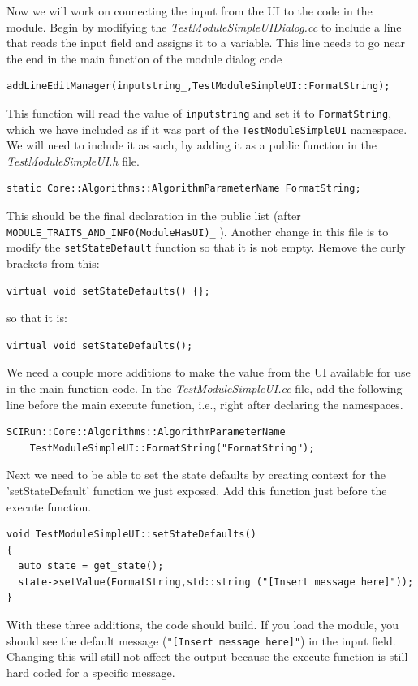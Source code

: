 \documentclass[fleqn,11pt,openany]{book}
\begin{document}
Now we will work on connecting the input from the UI to the code in the module.  
Begin by modifying the \emph{TestModuleSimpleUIDialog.cc} to include a line that reads the input field and assigns it to a variable. 
This line needs to go near the end in the main function of the module dialog code
\begin{verbatim}
addLineEditManager(inputstring_,TestModuleSimpleUI::FormatString);
\end{verbatim}
This function will read the value of \verb|inputstring| and set it to \verb|FormatString|, which we have included as if it was part of the \verb|TestModuleSimpleUI| namespace.  
We will need to include it as such, by adding it as a public function in the \emph{TestModuleSimpleUI.h} file.
\begin{verbatim}
static Core::Algorithms::AlgorithmParameterName FormatString;
\end{verbatim}
This should be the final declaration in the public list (after \verb|MODULE_TRAITS_AND_INFO(ModuleHasUI)_| ).
Another change in this file is to modify the \verb|setStateDefault| function so that it is not empty.  
Remove the curly brackets from this:
\begin{verbatim}
virtual void setStateDefaults() {};
\end{verbatim}
so that it is:
\begin{verbatim}
virtual void setStateDefaults();
\end{verbatim}
We need a couple more additions to make the value from the UI available for use in the main function code.  
In the \emph{TestModuleSimpleUI.cc} file, add the following line before the main execute function, i.e., right after declaring the namespaces.
\begin{verbatim}
SCIRun::Core::Algorithms::AlgorithmParameterName 
    TestModuleSimpleUI::FormatString("FormatString");
\end{verbatim}

Next we need to be able to set the state defaults by creating context for the 'setStateDefault' function we just exposed.
Add this function just before the execute function.
\begin{verbatim}
void TestModuleSimpleUI::setStateDefaults()
{
  auto state = get_state();
  state->setValue(FormatString,std::string ("[Insert message here]"));
}
\end{verbatim}
With these three additions, the code should build.
If you load the module, you should see the default message (\verb|"[Insert message here]"|) in the input field.  
Changing this will still not affect the output because the execute function is still hard coded for a specific message.  
\end{document}
